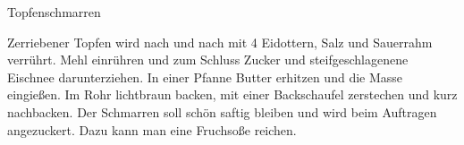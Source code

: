 \begin{recipe}{Topfenschmarren}
%
%
%
%
%
%

\begin{ingredients}
\end{ingredients}

\begin{instructions}
    Zerriebener Topfen wird nach und nach mit 4 Eidottern, Salz und Sauerrahm verrührt.
    Mehl einrühren und zum Schluss Zucker und steifgeschlagenene Eischnee darunterziehen.
    In einer Pfanne Butter erhitzen und die Masse eingießen.
    Im Rohr lichtbraun backen, mit einer Backschaufel zerstechen und kurz nachbacken.
    Der Schmarren soll schön saftig bleiben und wird beim Auftragen angezuckert.
    Dazu kann man eine Fruchsoße reichen.
\end{instructions}
\end{recipe}
